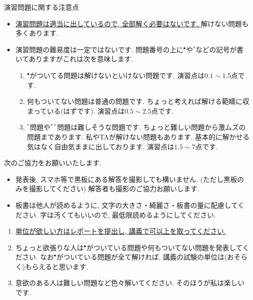 \documentclass[dvipdfmx,a4paper,11pt]{article}
\theoremstyle{definition}
\begin{document}
演習問題に関する注意点
\begin{itemize}
  \setlength{\parskip}{0cm} 
  \setlength{\itemsep}{0cm} 
\item \underline{演習問題は適当に出しているので, 全部解く必要はないです. } 解けない問題も多くあります.
\item 演習問題の難易度は一定ではないです. 問題番号の上に$^\bullet$や$^*$などの記号が書いてありますがこれは次を意味します.
\begin{enumerate}
  \setlength{\parskip}{0cm} 
  \setlength{\itemsep}{0cm} 
\item $^\bullet$がついてる問題は解けないといけない問題です. 演習点は$0.1\sim1.5$点です. %
\item 何もついてない問題は普通の問題です. ちょっと考えれば解ける範疇に収まっている(はずです). 演習点は$0.5\sim2.5$点です.
\item $^*$問題や$^{**}$問題は難しそうな問題です. ちょっと難しい問題から激ムズの問題まであります. 私やTAが解けない問題もあります. 基本的に解かせる気はなく自由気ままに出しております. 演習点は$1.5 \sim 7$点です. 
\end{enumerate}
\end{itemize}

次のご協力をお願いいたします.
\begin{itemize}
  \setlength{\parskip}{0cm} 
  \setlength{\itemsep}{0cm} 
\item 発表後, スマホ等で黒板にある解答を撮影しても構いません. (ただし黒板のみを撮影してください) %
解答者も撮影のご協力お願いします.
\item 板書は他人が読めるように, 文字の大きさ・綺麗さ・板書の量に配慮してください. 字は汚くてもいいので, 最低限読めるようにしてください. %
\end{itemize}


\medskip
{}
\begin{enumerate}
  \setlength{\parskip}{0cm} 
  \setlength{\itemsep}{0cm} 
\item \underline{単位が欲しい方はレポートを提出し, 講義で可以上を取ってください.} %
\item ちょっと欲張りな人は$^\bullet$がついている問題や何もついてない問題を発表してください. なお$^{\bullet}$がついている問題が全て解ければ, 講義の試験の単位は(おそらく)もらえると思います.
\item 意欲のある人は難しい問題など色々解いてください. そのほうが私は楽しいです.
\end{enumerate}
\end{document}
